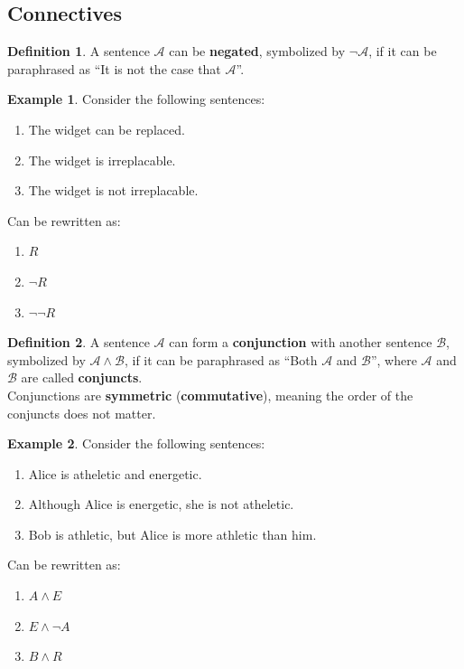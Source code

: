 \documentclass{tufte-handout}
\theoremstyle{definition}
\newtheorem{defn}{Definition}
\theoremstyle{example}
\newtheorem{exmp}{Example}
\theoremstyle{remark}
\begin{document}
\subsection{Connectives}
\begin{framed}
  \begin{defn}
    A sentence $\mathcal{A}$ can be \textbf{negated}, symbolized by $\neg \mathcal{A}$, if it can be paraphrased as ``It is not the case that $\mathcal{A}$''.
  \end{defn}
\end{framed}
\begin{exmp}
  Consider the following sentences:
  \begin{enumerate}[leftmargin=3\parindent]
    \item The widget can be replaced.
    \item The widget is irreplacable.
    \item The widget is not irreplacable.
  \end{enumerate}
  Can be rewritten as:
  \begin{enumerate}[leftmargin=3\parindent]
    \item $R$
    \item $\neg R$
    \item $\neg \neg R$
  \end{enumerate}
\end{exmp}
\begin{framed}
  \begin{defn}
    A sentence $\mathcal{A}$ can form a \textbf{conjunction} with another sentence $\mathcal{B}$, symbolized by $\mathcal{A} \land \mathcal{B}$, if it can be paraphrased as ``Both $\mathcal{A}$ and $\mathcal{B}$'', where $\mathcal{A}$ and $\mathcal{B}$ are called \textbf{conjuncts}. \\[1em]
    Conjunctions are \textbf{symmetric} (\textbf{commutative}), meaning the order of the conjuncts does not matter.
  \end{defn}
\end{framed}
\begin{exmp}
  Consider the following sentences:
  \begin{enumerate}[leftmargin=3\parindent]
    \item Alice is atheletic and energetic.
    \item Although Alice is energetic, she is not atheletic.
    \item Bob is athletic, but Alice is more athletic than him.
  \end{enumerate}
  Can be rewritten as:
  \begin{enumerate}[leftmargin=3\parindent]
    \item $A \land E$
    \item $E \land \neg A$
    \item $B \land R$
  \end{enumerate}
\end{exmp}
\end{document}
